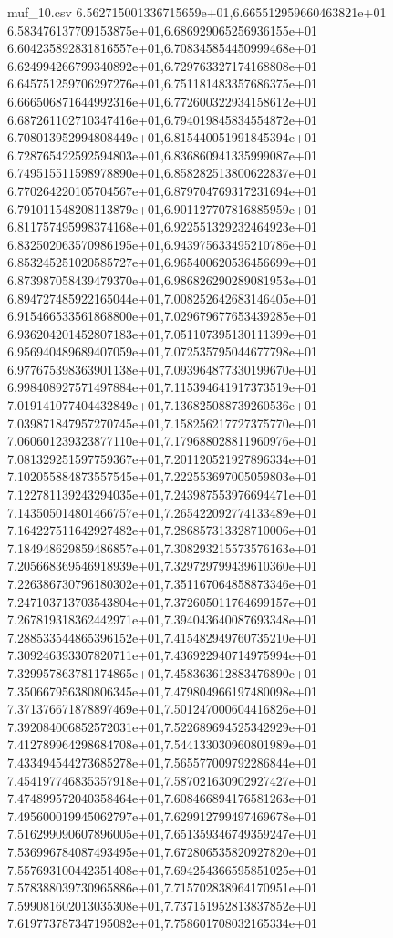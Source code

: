 \begin{filecontents*}{muf_10.csv}
6.562715001336715659e+01,6.665512959660463821e+01
6.583476137709153875e+01,6.686929065256936155e+01
6.604235892831816557e+01,6.708345854450999468e+01
6.624994266799340892e+01,6.729763327174168808e+01
6.645751259706297276e+01,6.751181483357686375e+01
6.666506871644992316e+01,6.772600322934158612e+01
6.687261102710347416e+01,6.794019845834554872e+01
6.708013952994808449e+01,6.815440051991845394e+01
6.728765422592594803e+01,6.836860941335999087e+01
6.749515511598978890e+01,6.858282513800622837e+01
6.770264220105704567e+01,6.879704769317231694e+01
6.791011548208113879e+01,6.901127707816885959e+01
6.811757495998374168e+01,6.922551329232464923e+01
6.832502063570986195e+01,6.943975633495210786e+01
6.853245251020585727e+01,6.965400620536456699e+01
6.873987058439479370e+01,6.986826290289081953e+01
6.894727485922165044e+01,7.008252642683146405e+01
6.915466533561868800e+01,7.029679677653439285e+01
6.936204201452807183e+01,7.051107395130111399e+01
6.956940489689407059e+01,7.072535795044677798e+01
6.977675398363901138e+01,7.093964877330199670e+01
6.998408927571497884e+01,7.115394641917373519e+01
7.019141077404432849e+01,7.136825088739260536e+01
7.039871847957270745e+01,7.158256217727375770e+01
7.060601239323877110e+01,7.179688028811960976e+01
7.081329251597759367e+01,7.201120521927896334e+01
7.102055884873557545e+01,7.222553697005059803e+01
7.122781139243294035e+01,7.243987553976694471e+01
7.143505014801466757e+01,7.265422092774133489e+01
7.164227511642927482e+01,7.286857313328710006e+01
7.184948629859486857e+01,7.308293215573576163e+01
7.205668369546918939e+01,7.329729799439610360e+01
7.226386730796180302e+01,7.351167064858873346e+01
7.247103713703543804e+01,7.372605011764699157e+01
7.267819318362442971e+01,7.394043640087693348e+01
7.288533544865396152e+01,7.415482949760735210e+01
7.309246393307820711e+01,7.436922940714975994e+01
7.329957863781174865e+01,7.458363612883476890e+01
7.350667956380806345e+01,7.479804966197480098e+01
7.371376671878897469e+01,7.501247000604416826e+01
7.392084006852572031e+01,7.522689694525342929e+01
7.412789964298684708e+01,7.544133030960801989e+01
7.433494544273685278e+01,7.565577009792286844e+01
7.454197746835357918e+01,7.587021630902927427e+01
7.474899572040358464e+01,7.608466894176581263e+01
7.495600019945062797e+01,7.629912799497469678e+01
7.516299090607896005e+01,7.651359346749359247e+01
7.536996784087493495e+01,7.672806535820927820e+01
7.557693100442351408e+01,7.694254366595851025e+01
7.578388039730965886e+01,7.715702838964170951e+01
7.599081602013035308e+01,7.737151952813837852e+01
7.619773787347195082e+01,7.758601708032165334e+01

\end{filecontents*}
